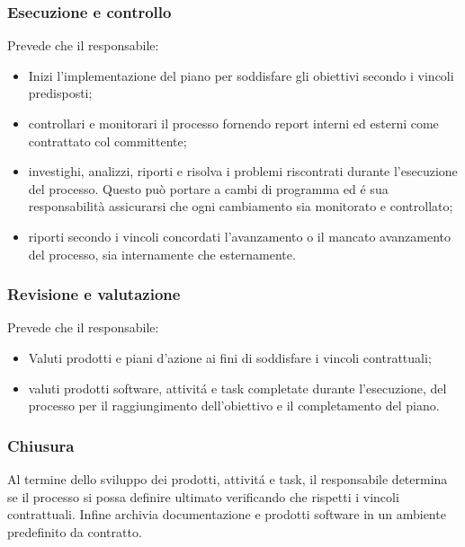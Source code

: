     \subsubsection{Esecuzione e controllo}\label{sec:execution}
        Prevede che il responsabile:
        \begin{itemize}
            \item Inizi l'implementazione del piano per soddisfare gli obiettivi secondo i vincoli predisposti;
            \item controllari e monitorari il processo fornendo report interni ed esterni come contrattato col committente;
            \item investighi, analizzi, riporti e risolva i problemi riscontrati durante l'esecuzione del processo. Questo può portare a cambi di programma ed \'e sua responsabilità assicurarsi che ogni cambiamento sia monitorato e controllato;
            \item riporti secondo i vincoli concordati l'avanzamento o il mancato avanzamento del processo, sia internamente che esternamente.
        \end{itemize}
    \subsubsection{Revisione e valutazione}\label{sec:review}
        Prevede che il responsabile:
        \begin{itemize}
            \item Valuti prodotti e piani d'azione ai fini di soddisfare i vincoli contrattuali;
            \item valuti prodotti software, attivit\'a e task completate durante l'esecuzione, del processo per il raggiungimento dell'obiettivo e il completamento del piano.
        \end{itemize}
    \subsubsection{Chiusura}\label{sec:closure}
        Al termine dello sviluppo dei prodotti, attivit\'a e task, il responsabile determina se il processo si possa definire ultimato verificando che rispetti i vincoli contrattuali. Infine archivia documentazione e prodotti software in un ambiente predefinito da contratto.
        
        